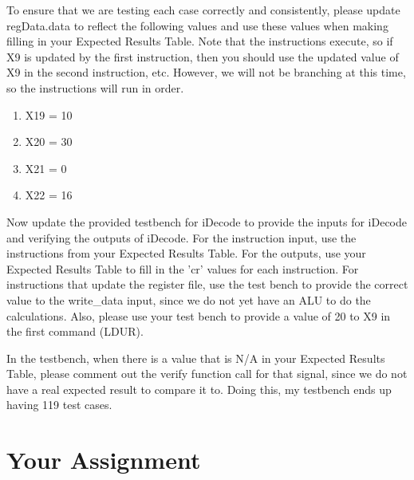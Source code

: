 To ensure that we are testing each case correctly and consistently, please update regData.data to reflect the following values and use these values when making filling in your Expected Results Table.  Note that the instructions execute, so if X9 is updated by the first instruction, then you should use the updated value of X9 in the second instruction, etc.  However, we will not be branching at this time, so the instructions will run in order.

\begin{enumerate}
	\item X19 = 10
	\item X20 = 30
	\item X21 = 0
	\item X22 = 16
\end{enumerate}

Now update the provided testbench for iDecode to provide the inputs for iDecode and verifying the outputs of iDecode.  For the instruction input, use the instructions from your Expected Results Table.  For the outputs, use your Expected Results Table to fill in the 'cr' values for each instruction.  For instructions that update the register file, use the test bench to provide the correct value to the write\_data input, since we do not yet have an ALU to do the calculations.  Also, please use your test bench to provide a value of 20 to X9 in the first command (LDUR).

In the testbench, when there is a value that is N/A in your Expected Results Table, please comment out the verify function call for that signal, since we do not have a real expected result to compare it to.  Doing this, my testbench ends up having 119 test cases.

\section{Your Assignment}

